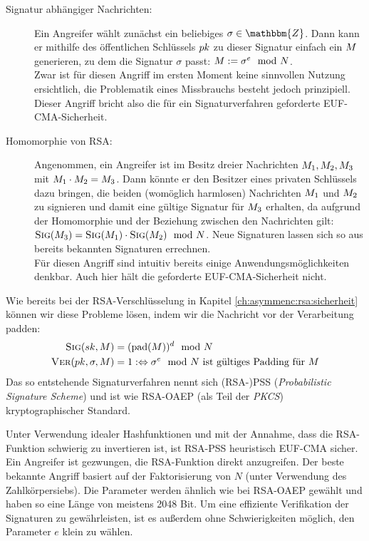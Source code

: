 \begin{description}
    \item[Signatur abhängiger Nachrichten:] Ein Angreifer wählt zunächst ein beliebiges $\sigma \in \mathbbm{Z}$. Dann kann er mithilfe des öffentlichen
    Schlüssels $pk$ zu dieser Signatur einfach ein $M$ generieren, zu dem die Signatur $\sigma$ passt: $M := \sigma^e \mod N$.\\
    Zwar ist für diesen Angriff im ersten Moment keine sinnvollen Nutzung ersichtlich, die Problematik eines Missbrauchs besteht jedoch prinzipiell.
    Dieser Angriff bricht also die für ein Signaturverfahren geforderte EUF-CMA-Sicherheit.
    \item[Homomorphie von RSA:] Angenommen, ein Angreifer ist im Besitz dreier Nachrichten $M_1,M_2,M_3$ mit $M_1 \cdot M_2 =
    M_3$. Dann könnte er den Besitzer eines privaten Schlüssels dazu bringen, die beiden (womöglich harmlosen) Nachrichten $M_1$ und $M_2$ zu
    signieren und damit eine gültige Signatur für $M_3$ erhalten, da aufgrund der Homomorphie und der Beziehung zwischen den Nachrichten gilt:
    $\textsc{Sig}(M_3) = \textsc{Sig}(M_1) \cdot \textsc{Sig}(M_2) \mod N$. Neue Signaturen lassen sich so aus bereits bekannten Signaturen errechnen.\\
    Für diesen Angriff sind intuitiv bereits einige Anwendungsmöglichkeiten denkbar. Auch hier hält die geforderte EUF-CMA-Sicherheit nicht.
\end{description}
Wie bereits bei der RSA-Verschlüsselung in Kapitel \ref{ch:asymmenc:rsa:sicherheit} können wir diese Probleme lösen, indem wir die Nachricht
vor der Verarbeitung padden:
\begin{align*}
\textsc{Sig}(sk,M) &= (\text{pad}(M))^d \mod N\\
\textsc{Ver}(pk,\sigma,M) &= 1 :\Leftrightarrow \sigma^e \mod N \text{ ist gültiges Padding für } M
\end{align*}
Das so entstehende
Signaturverfahren nennt sich (RSA-)PSS (\emph{Probabilistic Signature Scheme}) und ist wie RSA-OAEP (als Teil der \emph{PKCS})
kryptographischer Standard.

Unter Verwendung idealer Hashfunktionen und mit der Annahme, dass die RSA-Funktion schwierig zu invertieren ist, ist RSA-PSS
heuristisch EUF-CMA sicher. Ein Angreifer ist gezwungen, die RSA-Funktion direkt anzugreifen. Der beste bekannte Angriff basiert auf der
Faktorisierung von $N$ (unter Verwendung des Zahlkörpersiebs). Die Parameter werden ähnlich wie bei RSA-OAEP gewählt und haben so eine Länge
von meistens 2048 Bit. Um eine effiziente Verifikation der Signaturen zu gewährleisten, ist es außerdem ohne Schwierigkeiten möglich, den Parameter $e$ klein zu
wählen.


